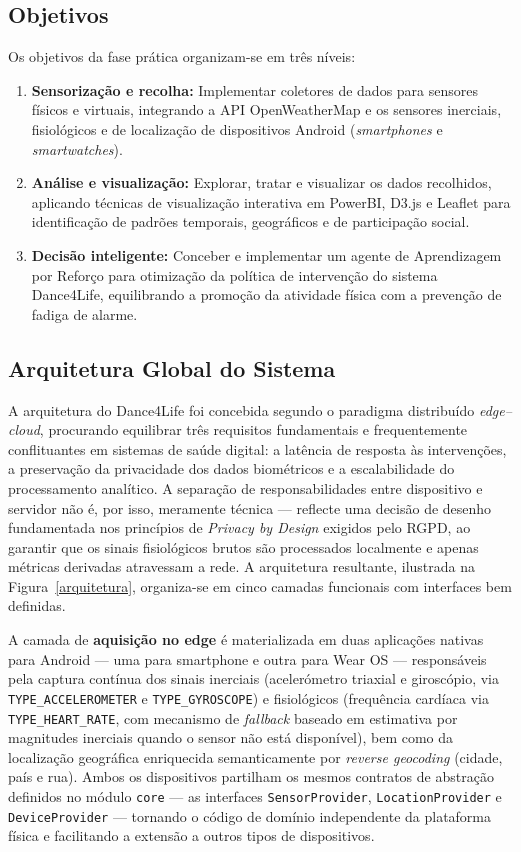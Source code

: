\documentclass[runningheads]{llncs}
\begin{document}
\subsection{Objetivos}
Os objetivos da fase prática organizam-se em três níveis:
\begin{enumerate}
\item \textbf{Sensorização e recolha:} Implementar coletores de dados para sensores físicos e virtuais, integrando a API OpenWeatherMap e os sensores inerciais, fisiológicos e de localização de dispositivos Android (\textit{smartphones} e \textit{smartwatches}).
\item \textbf{Análise e visualização:} Explorar, tratar e visualizar os dados recolhidos, aplicando técnicas de visualização interativa em PowerBI, D3.js e Leaflet para identificação de padrões temporais, geográficos e de participação social.
\item \textbf{Decisão inteligente:} Conceber e implementar um agente de Aprendizagem por Reforço para otimização da política de intervenção do sistema Dance4Life, equilibrando a promoção da atividade física com a prevenção de fadiga de alarme.
\end{enumerate}

\subsection{Arquitetura Global do Sistema}
A arquitetura do Dance4Life foi concebida segundo o paradigma distribuído \emph{edge--cloud}, procurando equilibrar três requisitos fundamentais e frequentemente conflituantes em sistemas de saúde digital: a latência de resposta às intervenções, a preservação da privacidade dos dados biométricos e a escalabilidade do processamento analítico. A separação de responsabilidades entre dispositivo e servidor não é, por isso, meramente técnica --- reflecte uma decisão de desenho fundamentada nos princípios de \emph{Privacy by Design} exigidos pelo RGPD, ao garantir que os sinais fisiológicos brutos são processados localmente e apenas métricas derivadas atravessam a rede. A arquitetura resultante, ilustrada na Figura~\ref{arquitetura}, organiza-se em cinco camadas funcionais com interfaces bem definidas.

A camada de \textbf{aquisição no edge} é materializada em duas aplicações nativas para Android --- uma para smartphone e outra para Wear OS --- responsáveis pela captura contínua dos sinais inerciais (acelerómetro triaxial e giroscópio, via \texttt{TYPE\_ACCELEROMETER} e \texttt{TYPE\_GYROSCOPE}) e fisiológicos (frequência cardíaca via \texttt{TYPE\_HEART\_RATE}, com mecanismo de \emph{fallback} baseado em estimativa por magnitudes inerciais quando o sensor não está disponível), bem como da localização geográfica enriquecida semanticamente por \emph{reverse geocoding} (cidade, país e rua). Ambos os dispositivos partilham os mesmos contratos de abstração definidos no módulo \texttt{core} --- as interfaces \texttt{SensorProvider}, \texttt{LocationProvider} e \texttt{DeviceProvider} --- tornando o código de domínio independente da plataforma física e facilitando a extensão a outros tipos de dispositivos.
\end{document}
